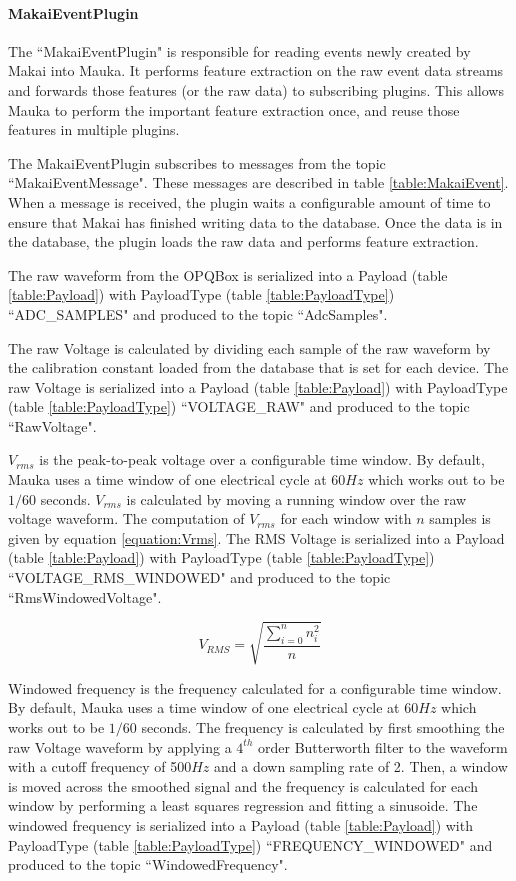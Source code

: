 \paragraph{MakaiEventPlugin} The ``MakaiEventPlugin" is responsible for reading events newly created by Makai into Mauka. It performs feature extraction on the raw event data streams and forwards those features (or the raw data) to subscribing plugins. This allows Mauka to perform the important feature extraction once, and reuse those features in multiple plugins.

The MakaiEventPlugin subscribes to messages from the topic ``MakaiEventMessage". These messages are described in table \ref{table:MakaiEvent}. When a message is received, the plugin waits a configurable amount of time to ensure that Makai has finished writing data to the database. Once the data is in the database, the plugin loads the raw data and performs feature extraction.

The raw waveform from the OPQBox is serialized into a Payload (table \ref{table:Payload}) with PayloadType (table \ref{table:PayloadType}) ``ADC\_SAMPLES" and produced to the topic ``AdcSamples".

The raw Voltage is calculated by dividing each sample of the raw waveform by the calibration constant loaded from the database that is set for each device. The raw Voltage  is serialized into a Payload (table \ref{table:Payload}) with PayloadType (table \ref{table:PayloadType}) ``VOLTAGE\_RAW" and produced to the topic ``RawVoltage".

$V_{rms}$ is the peak-to-peak voltage over a configurable time window. By default, Mauka uses a time window of one electrical cycle at 60$Hz$ which works out to be $1/60$ seconds. $V_{rms}$ is calculated by moving a running window over the raw voltage waveform. The computation of $V_{rms}$ for each window with $n$ samples is given by equation \ref{equation:Vrms}. The RMS Voltage  is serialized into a Payload (table \ref{table:Payload}) with PayloadType (table \ref{table:PayloadType}) ``VOLTAGE\_RMS\_WINDOWED" and produced to the topic ``RmsWindowedVoltage".

\begin{equation}
\label{equation:Vrms}
	V_{RMS} = \sqrt{\frac{\sum_{i=0}^{n} n_{i}^2}{n}}
\end{equation}

Windowed frequency is the frequency calculated for a configurable time window. By default, Mauka uses a time window of one electrical cycle at 60$Hz$ which works out to be $1/60$ seconds. The frequency is calculated by first smoothing the raw Voltage waveform by applying a $4^{th}$ order Butterworth filter to the waveform with a cutoff frequency of 500$Hz$ and a down sampling rate of 2. Then, a window is moved across the smoothed signal and the frequency is calculated for each window by performing a least squares regression and fitting a sinusoide. The windowed frequency is serialized into a Payload (table \ref{table:Payload}) with PayloadType (table \ref{table:PayloadType}) ``FREQUENCY\_WINDOWED" and produced to the topic ``WindowedFrequency".

